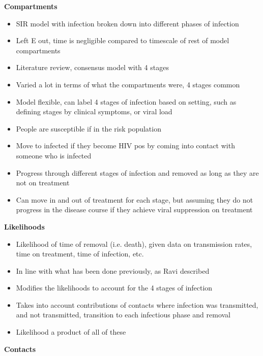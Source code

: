 \textbf{Compartments}

\begin{itemize}
    \item SIR model with infection broken down into different phases of infection
    \item Left E out, time is negligible compared to timescale of rest of model compartments
    \item Literature review, consensus model with 4 stages
    \item Varied a lot in terms of what the compartments were, 4 stages common
    \item Model flexible, can label 4 stages of infection based on setting, such as defining stages by clinical symptoms, or viral load
    \item People are susceptible if in the risk population
    \item Move to infected if they become HIV pos by coming into contact with someone who is infected
    \item Progress through different stages of infection and removed as long as they are not on treatment
    \item Can move in and out of treatment for each stage, but assuming they do not progress in the disease course if they achieve viral suppression on treatment
\end{itemize}

\textbf{Likelihoods}

\begin{itemize}
    \item Likelihood of time of removal (i.e. death), given data on transmission rates, time on treatment, time of infection, etc.
    \item In line with what has been done previously, as Ravi described
    \item Modifies the likelihoods to account for the 4 stages of infection
    \item Takes into account contributions of contacts where infection was transmitted, and not transmitted, transition to each infectious phase and removal
    \item Likelihood a product of all of these
\end{itemize}

\textbf{Contacts}

